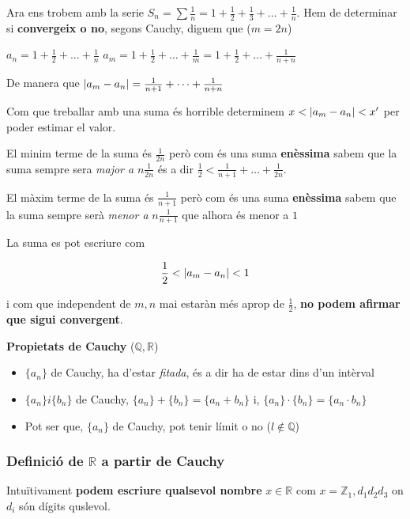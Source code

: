 \documentclass[12pt]{article}
\newcommand{\R}{\mathbb{R}}
\newcommand{\Z}{\mathbb{Z}}
\newcommand{\Q}{\mathbb{Q}}
\begin{document}
    \begin{examplebox}{}
        Ara ens trobem amb la serie $S_n = \sum \frac{1}{n} = 1 + \frac{1}{2} + \frac{1}{3}+ \dots + \frac{1}{n}$. Hem de determinar si \textbf{convergeix o no}, segons Cauchy, diguem que ($m = 2n$)

        $a_n = 1 + \frac{1}{2} + \dots + \frac{1}{n}$
        $a_m = 1+ \frac{1}{2} + \dots + \frac{1}{m} = 1+ \frac{1}{2} + \dots + \frac{1}{n + n}$

        De manera que $\abs{a_m - a_n} = \frac{1}{n+1} + \dots + \frac{1}{n+n}$
    
        Com que treballar amb una suma és horrible determinem $x < \abs{a_m-a_n} < x'$ per poder estimar el valor.

        El minim terme de la suma és $\frac{1}{2n}$ però com és una suma \textbf{enèssima} sabem que la suma sempre sera \textit{major a} $n \frac{1}{2n}$ és a dir $\frac{1}{2}<\frac{1}{n+1} + \dots + \frac{1}{2n}$.

        El màxim terme de la suma és $\frac{1}{n+1}$ però com és una suma \textbf{enèssima} sabem que la suma sempre serà \textit{menor a} $n \frac{1}{n+1}$ que alhora és menor a $1$

        La suma es pot escriure com

        \[\frac{1}{2}< \abs{a_m - a_n} < 1\]

        i com que independent de $m,n$ mai estaràn més aprop de $\frac{1}{2}$, \textbf{no podem afirmar que sigui convergent}.
    \end{examplebox}

    \textbf{Propietats de Cauchy} ($\Q, \R$)
    \begin{itemize}
        \item $\{a_n\}$ de Cauchy, ha d'estar \textit{fitada}, és a dir ha de estar dins d'un intèrval
        \item $\{a_n\} i \{b_n\}$ de Cauchy, $\{a_n\} +\{b_n\} = \{a_n + b_n\}$ i, $\{a_n\} \cdot \{b_n\} = \{a_n \cdot b_n\}$
        \item Pot ser que, $\{a_n\}$ de Cauchy, pot tenir límit o no ($l \notin \Q$)
    \end{itemize}

    \subsubsection{\texorpdfstring{Definició de $\R$ a partir de Cauchy}{Definició de R a partir de Cauchy}}

    Intuïtivament \textbf{podem escriure qualsevol nombre} $x \in \R$ com $x = \boxed{\Z_{1}},\boxed{d_1d_2d_3}$ on $d_i$ són dígits quslevol.
\end{document}
